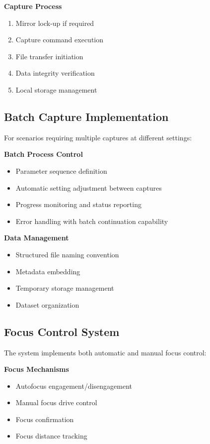 \textbf{Capture Process}
\begin{enumerate}
    \item Mirror lock-up if required
    \item Capture command execution
    \item File transfer initiation
    \item Data integrity verification
    \item Local storage management
\end{enumerate}

\subsection{Batch Capture Implementation}
For scenarios requiring multiple captures at different settings:

\textbf{Batch Process Control}
\begin{itemize}
    \item Parameter sequence definition
    \item Automatic setting adjustment between captures
    \item Progress monitoring and status reporting
    \item Error handling with batch continuation capability
\end{itemize}

\textbf{Data Management}
\begin{itemize}
    \item Structured file naming convention
    \item Metadata embedding
    \item Temporary storage management
    \item Dataset organization
\end{itemize}

\subsection{Focus Control System}
The system implements both automatic and manual focus control:

\textbf{Focus Mechanisms}
\begin{itemize}
    \item Autofocus engagement/disengagement
    \item Manual focus drive control
    \item Focus confirmation
    \item Focus distance tracking
\end{itemize}

